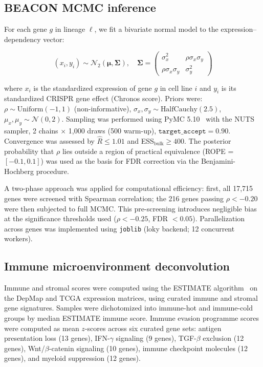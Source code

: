 \documentclass[12pt]{article}
\begin{document}
\subsection*{BEACON MCMC inference}

For each gene $g$ in lineage $\ell$, we fit a bivariate normal model to the expression--dependency vector:

\begin{equation}
(x_i, y_i) \sim \mathcal{N}_2(\boldsymbol{\mu}, \boldsymbol{\Sigma}), \quad
\boldsymbol{\Sigma} = \begin{pmatrix} \sigma_x^2 & \rho\sigma_x\sigma_y \\ \rho\sigma_x\sigma_y & \sigma_y^2 \end{pmatrix}
\end{equation}

where $x_i$ is the standardized expression of gene $g$ in cell line $i$ and $y_i$ is its standardized CRISPR gene effect (Chronos score). Priors were: $\rho \sim \text{Uniform}(-1, 1)$ (non-informative), $\sigma_x, \sigma_y \sim \text{HalfCauchy}(2.5)$, $\mu_x, \mu_y \sim \mathcal{N}(0, 2)$. Sampling was performed using PyMC 5.10~\citep{Salvatier2016} with the NUTS sampler, 2 chains $\times$ 1,000 draws (500 warm-up), $\texttt{target\_accept} = 0.90$. Convergence was assessed by $\hat{R} \leq 1.01$ and ESS$_\text{bulk} \geq 400$. The posterior probability that $\rho$ lies outside a region of practical equivalence (ROPE = $[-0.1, 0.1]$) was used as the basis for FDR correction via the Benjamini-Hochberg procedure.

A two-phase approach was applied for computational efficiency: first, all 17,715 genes were screened with Spearman correlation; the 216 genes passing $\rho < -0.20$ were then subjected to full MCMC. This pre-screening introduces negligible bias at the significance thresholds used ($\rho < -0.25$, FDR $< 0.05$). Parallelization across genes was implemented using \texttt{joblib} (loky backend; 12 concurrent workers).

\subsection*{Immune microenvironment deconvolution}

Immune and stromal scores were computed using the ESTIMATE algorithm~\citep{Yoshihara2013} on the DepMap and TCGA expression matrices, using curated immune and stromal gene signatures. Samples were dichotomized into immune-hot and immune-cold groups by median ESTIMATE immune score. Immune evasion programme scores were computed as mean $z$-scores across six curated gene sets: antigen presentation loss (13 genes), IFN-$\gamma$ signaling (9 genes), TGF-$\beta$ exclusion (12 genes), Wnt/$\beta$-catenin signaling (10 genes), immune checkpoint molecules (12 genes), and myeloid suppression (12 genes).
\end{document}
